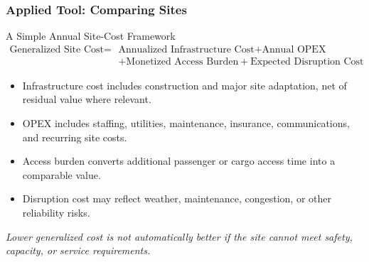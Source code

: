 \documentclass{beamer}
\begin{document}
\begin{frame}[t]
\frametitle{Applied Tool: Comparing Sites}
\begin{block}{A Simple Annual Site-Cost Framework}
\[
\begin{split}
\text{Generalized Site Cost}={}&\text{Annualized Infrastructure Cost}+\text{Annual OPEX}\\
&+\text{Monetized Access Burden}+\text{Expected Disruption Cost}
\end{split}
\]
\end{block}
\begin{itemize}
\item Infrastructure cost includes construction and major site adaptation, net of residual value where relevant.
\item OPEX includes staffing, utilities, maintenance, insurance, communications, and recurring site costs.
\item Access burden converts additional passenger or cargo access time into a comparable value.
\item Disruption cost may reflect weather, maintenance, congestion, or other reliability risks.
\end{itemize}
\textit{Lower generalized cost is not automatically better if the site cannot meet safety, capacity, or service requirements.}
\end{frame}
\end{document}
